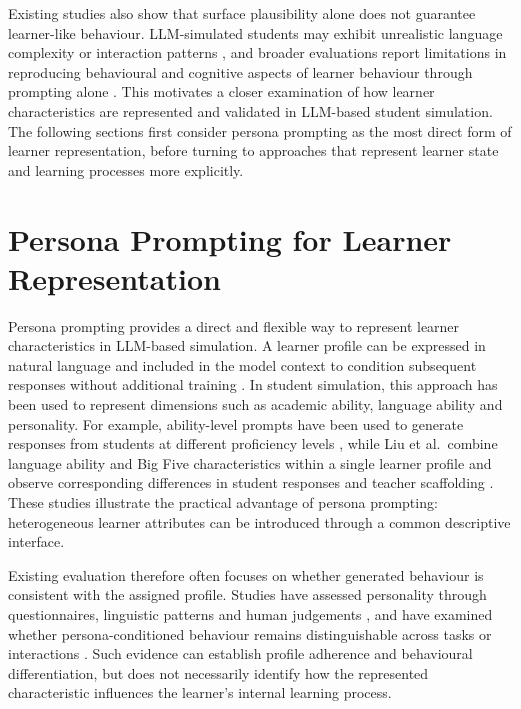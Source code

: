 Existing studies also show that surface plausibility alone does not guarantee learner-like behaviour. LLM-simulated students may exhibit unrealistic language complexity or interaction patterns \cite{martynova-etal-2025-can}, and broader evaluations report limitations in reproducing behavioural and cognitive aspects of learner behaviour through prompting alone \cite{scarlatos-etal-2026-simulated}. This motivates a closer examination of how learner characteristics are represented and validated in LLM-based student simulation. The following sections first consider persona prompting as the most direct form of learner representation, before turning to approaches that represent learner state and learning processes more explicitly.

\section{Persona Prompting for Learner Representation}
\label{sec:persona-prompting}

Persona prompting provides a direct and flexible way to represent learner characteristics in LLM-based simulation. A learner profile can be expressed in natural language and included in the model context to condition subsequent responses without additional training \cite{tseng-etal-2024-two,wang-etal-2024-rolellm}. In student simulation, this approach has been used to represent dimensions such as academic ability, language ability and personality. For example, ability-level prompts have been used to generate responses from students at different proficiency levels \cite{benedetto-etal-2024-using}, while Liu et al.~combine language ability and Big Five characteristics within a single learner profile and observe corresponding differences in student responses and teacher scaffolding \cite{liu-etal-2024-personality}. These studies illustrate the practical advantage of persona prompting: heterogeneous learner attributes can be introduced through a common descriptive interface.

Existing evaluation therefore often focuses on whether generated behaviour is consistent with the assigned profile. Studies have assessed personality through questionnaires, linguistic patterns and human judgements \cite{jiang-etal-2024-personallm}, and have examined whether persona-conditioned behaviour remains distinguishable across tasks or interactions \cite{reusens-etal-2025-economists}. Such evidence can establish profile adherence and behavioural differentiation, but does not necessarily identify how the represented characteristic influences the learner's internal learning process.

